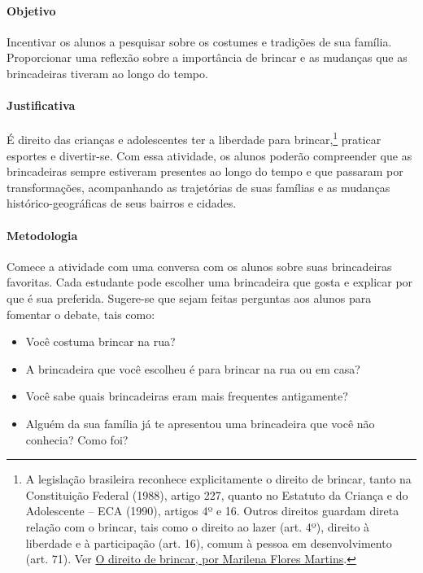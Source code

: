 \documentclass[11pt]{extarticle}
\begin{document}
\paragraph{Objetivo} Incentivar os alunos a pesquisar sobre os costumes e tradições de sua família. Proporcionar uma reflexão sobre a importância de brincar e as mudanças que as brincadeiras tiveram ao longo do tempo.

\paragraph{Justificativa} É direito das crianças e adolescentes ter a liberdade para brincar,\footnote{A legislação brasileira reconhece explicitamente o direito de brincar, tanto na Constituição Federal (1988), artigo 227, quanto no Estatuto da Criança e do Adolescente – ECA (1990), artigos 4º e 16. Outros direitos guardam direta relação com o brincar, tais como o direito ao lazer (art. 4º), direito à liberdade e à participação (art. 16), comum à pessoa em desenvolvimento (art. 71). Ver 
\href{http://primeirainfancia.org.br/eca-e-o-direito-de-brincar-por-marilena-flores-martins-do-ipa-brasil/}{O direito de brincar, por Marilena Flores Martins}.
} 
praticar esportes e divertir-se. Com essa atividade, os alunos poderão compreender que as brincadeiras sempre estiveram presentes ao longo do tempo e que passaram por transformações, acompanhando as trajetórias de suas famílias e as mudanças histórico-geográficas de seus bairros e cidades. 

\paragraph{Metodologia} Comece a atividade com uma conversa com os alunos sobre suas brincadeiras favoritas. Cada estudante pode escolher uma brincadeira que gosta e explicar por que é sua preferida. Sugere-se que sejam feitas perguntas aos alunos para fomentar o debate, tais como:

\begin{itemize}

\item Você costuma brincar na rua?

\item A brincadeira que você escolheu é para brincar na rua ou em casa?

\item Você sabe quais brincadeiras eram mais frequentes antigamente?

\item Alguém da sua família já te apresentou uma brincadeira que você não conhecia? Como foi?

\end{itemize}
\end{document}
